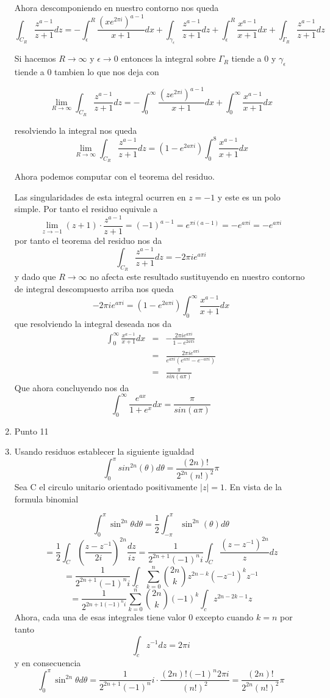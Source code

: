 \documentclass[12pt]{exam}
\begin{document}
\begin{enumerate}
    Ahora descomponiendo en nuestro contorno nos queda
    $$\int_{C_R}\frac{z^{a-1}}{z+1}dz = -\int_\epsilon^R \frac{(xe^{2\pi i})^{a-1}}{x+1}dx  + \int_{\gamma_\epsilon} \frac{z^{a-1}}{z+1}dz+\int_\epsilon^R\frac{x^{a-1}}{x+1}dx+\int_{\Gamma_R}\frac{z^{a-1}}{z+1}dz$$
    
    Si hacemos $R\to\infty$ y $\epsilon\to0$ entonces la integral sobre $\Gamma_R$ tiende a 0 y $\gamma_\epsilon$ tiende a 0 tambien lo que nos deja con

    $$\lim_{R\to\infty}\int_{C_R}\frac{z^{a-1}}{z+1}dz = -\int_0^\infty \frac{(ze^{2\pi i})^{a-1}}{x+1}dx+\int_0^\infty \frac{x^{a-1}}{x+1}dx$$

    resolviendo la integral nos queda
    $$\lim_{R\to\infty}\int_{C_R}\frac{z^{a-1}}{z+1}dz = (1-e^{2a\pi i})\int_0^8 \frac{x^{a-1}}{x+1}dx$$

    Ahora podemos computar con el teorema del residuo.

    Las singularidades de esta integral ocurren en $z=-1$ y este es un polo simple. Por tanto el residuo equivale a
    $$\lim_{z\to-1}(z+1)\cdot\frac{z^{a-1}}{z+1} = (-1)^{a-1} = e^{\pi i(a-1)}=-e^{a\pi i}=-e^{a\pi i}$$
    por tanto el teorema del residuo nos da
    $$\int_{C_R}\frac{z^{a-1}}{z+1}dz=-2\pi i e^{a\pi i}$$
    y dado que $R\to\infty$ no afecta este resultado sustituyendo en nuestro contorno de integral descompuesto arriba nos queda
    $$-2\pi i e^{a\pi i}=(1-e^{2a\pi i})\int_0^{\infty}\frac{x^{a-1}}{x+1}dx$$ que resolviendo la integral deseada nos da
    \begin{eqnarray*}
        \int_0^{\infty} \frac{x^{a-1}}{x+1}dx &=& -\frac{2\pi i e^{a\pi i}}{1-e^{2a\pi i}}\\
        &=& \frac{2\pi ie^{a\pi i}}{e^{a\pi i}(e^{a\pi i}-e^{-a\pi i})}\\
        &=& \frac{\pi}{sin(a\pi)}
    \end{eqnarray*}
    Que ahora concluyendo nos da
    $$\int_0^{\infty} \frac{e^{ax}}{1+e^x}dx = \frac{\pi}{sin(a\pi)}$$
    \item Punto 11
    \item Usando residuos establecer la siguiente igualdad $$\int_{0}^{\pi}sin^{2n}(\theta)d\theta = \frac{(2n)!}{2^{2n}(n!)^{2}}\pi$$
    Sea C el circulo unitario orientado positivamente $|z|=1$. En vista de la formula binomial

    $$\int_0^{\pi}\sin^{2n}\theta d\theta = \frac{1}{2}\int_{-\pi}^{\pi}\sin^{2n}(\theta)d\theta $$
    $$= \frac{1}{2}\int_C \left(\frac{z-z^{-1}}{2i}\right)^{2n}\frac{dz}{iz}=\frac{1}{2^{2n+1}(-1)^ni}\int_C \frac{(z-z^{-1})^{2n}}{z}dz$$
    $$=\frac{1}{2^{2n+1}(-1)^ni}\int_c\sum_{k=0}^{n}\binom{2n}{k}z^{2n-k}(-z^{-1})^kz^{-1}$$
    $$=\frac{1}{2^{2n+1(-1)^n i}}\sum_{k=0}^{n}\binom{2n}{k}(-1)^k \int_c z^{2n-2k-1}z$$
    Ahora, cada una de esas integrales tiene valor $0$ excepto cuando $k=n$ por tanto
    $$\int_c z^{-1}dz = 2\pi i$$
    y en consecuencia
    $$\int_0^{\pi}\sin^{2n}\theta d\theta = \frac{1}{2^{2n+1}(-1)^n}i\cdot\frac{(2n)!(-1)^n2\pi i}{(n!)^2}=\frac{(2n)!}{2^{2n}(n!)^2}\pi$$
\end{enumerate}
\end{document}
